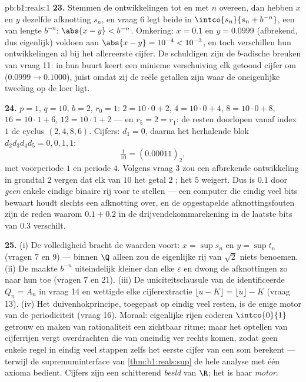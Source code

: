 \begin{solution}{pb:b1:reals:1}
\textbf{23.} Stemmen de ontwikkelingen tot en met $n$ overeen, dan hebben
$x$ en $y$ dezelfde afknotting $s_n$, en vraag 6 legt beide in
$\intco{s_n}{s_n + b^{-n}}$, een  van lengte $b^{-n}$: $\abs{x -
y} < b^{-n}$. Omkering: $x = 0.1$ en $y = 0.0999$ (afbrekend, dus
eigenlijk) voldoen aan $\abs{x - y} = 10^{-4} < 10^{-3}$, en toch
verschillen hun ontwikkelingen al bij het allereerste cijfer. De
schuldigen zijn de $b$-adische breuken van vraag 11: in hun buurt keert
een minieme verschuiving elk getoond cijfer om ($0.0999 \to 0.1000$),
juist omdat zij de reële getallen zijn waar de oneigenlijke tweeling op
de loer ligt.

\textbf{24.} $p = 1$, $q = 10$, $b = 2$, $r_0 = 1$: $2 = 10 \cdot 0 + 2$,
$4 = 10 \cdot 0 + 4$, $8 = 10 \cdot 0 + 8$, $16 = 10 \cdot 1 + 6$, $12 =
10 \cdot 1 + 2$ --- en $r_5 = 2 = r_1$: de resten doorlopen vanaf index
$1$ de cyclus $(2, 4, 8, 6)$. Cijfers: $d_1 = 0$, daarna het herhalende
blok $d_2 d_3 d_4 d_5 = 0, 0, 1, 1$:
\[
\tfrac{1}{10} = (0.0\overline{0011})_2 ,
\]
met voorperiode $1$ en periode $4$. Volgens vraag 3 zou een afbrekende
ontwikkeling in grondtal $2$ vergen dat elk  van $10$ het getal
$2$ ; het  $5$ weigert. Dus is $0.1$ door \emph{geen}
enkele eindige binaire rij voor te stellen --- een computer die eindig
veel bits bewaart houdt slechts een afknotting over, en de opgestapelde
afknottingsfouten zijn de reden waarom $0.1 + 0.2$ in de
drijvendekommarekening in de laatste bits van $0.3$ verschilt.

\textbf{25.} (i) De volledigheid bracht de waarden voort: $x = \sup s_n$
en $y = \sup t_n$ (vragen 7 en 9) --- binnen $\Q$ alleen zou de
eigenlijke rij van $\sqrt 2$ niets benoemen. (ii) De  maakte $b^{-n}$ uiteindelijk kleiner dan elke $\varepsilon$ en
dwong de afknottingen zo naar hun  toe (vragen 7 en 21). (iii) De
uniciteitsclausule van de  identificeerde $Q_n = A_n$ in vraag 14 en
wettigde elke cijferextractie $\lfloor u - K \rfloor = \lfloor u \rfloor
- K$ (vraag 13). (iv) Het duivenhokprincipe, toegepast op eindig veel
resten, is de enige motor van de periodiciteit (vraag 16). Moraal:
eigenlijke rijen coderen $\intco{0}{1}$ getrouw en maken van rationaliteit
een zichtbaar ritme; maar het optellen van cijferrijen vergt overdrachten
die van oneindig ver rechts komen, zodat geen enkele regel in eindig veel
stappen zelfs het eerste cijfer van een som berekent --- terwijl de
supremuminterface van \cref{thm:b1:reals:sup} de hele analyse met één
axioma bedient. Cijfers zijn een schitterend \emph{beeld} van $\R$; het
 is haar \emph{motor}.
\end{solution}

